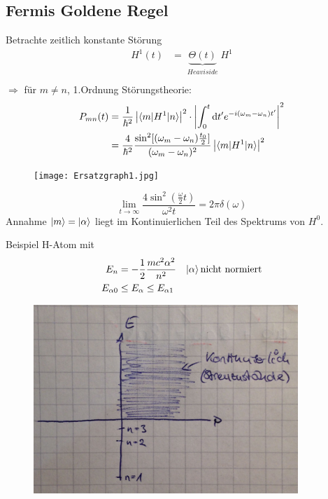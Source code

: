 \subsection{Fermis Goldene Regel}
	Betrachte zeitlich konstante Störung
		\begin{align*}
			H^1(t) &= \underbrace{\Theta (t)}_{\substack{Heaviside}} H^1 \\
		\end{align*}
	$\Rightarrow$ für $m \neq n$, 1.Ordnung Störungstheorie:
		\begin{align*}
			P_{mn}(t) 
			&= \frac{1}{\hbar^2} \left| \braket{m | H^1 | n}\right|^2 
			\cdot \left| \int_{0}^{t} \mathrm{d} t' e^{-i(\omega_m-\omega_n) t'} \right|^2 \\
			&= \frac{4}{\hbar^2} \frac{\sin^2[(\omega_m-\omega_n)
			\frac{t_0}{2}]}{(\omega_m-\omega_n)^2} 
			\left| \braket{m | H^1 | n}\right|^2
		\end{align*}
	\begin{figure} [h]
		\begin{center}
			\texttt{[image: Ersatzgraph1.jpg]}
		\end{center}
	\end{figure}
		\begin{equation*}
			\lim\limits_{t \rightarrow \infty} \frac{4 \sin^2(\frac{\omega}{2} t)}{\omega^2 t} = 2 \pi \delta (\omega)
		\end{equation*}
	Annahme $\ket{m} = \ket{\alpha}$ liegt im Kontinuierlichen Teil des Spektrums von $H^0$.
	
	Beispiel H-Atom mit
		\begin{align*}
			E_n &= - \frac{1}{2} \frac{m c^2 \alpha^2}{n^2} &
			\ket{\alpha} \text{nicht normiert} \\
			E_{\alpha 0} &\leq E_\alpha \leq E_{\alpha 1}
		\end{align*}
	\begin{figure} [h]
		\begin{center}
			\includegraphics[width=10cm]{Ersatzgraph2.jpg}
		\end{center}
	\end{figure}

